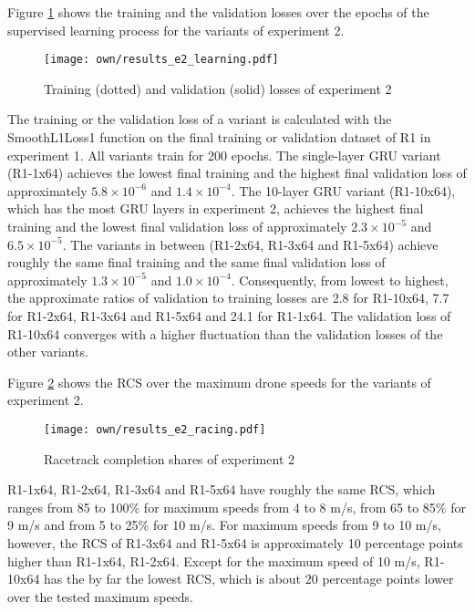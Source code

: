 Figure \ref{fig:e2_learn} shows the 
training and the validation losses
over the epochs of the supervised learning process for the variants of experiment 2.
\begin{figure}
    \centering
    \texttt{[image: own/results\_e2\_learning.pdf]}
    \caption[
        Training and validation losses of experiment 2
    ]{
        Training (dotted) and validation (solid) losses of experiment 2
    \label{fig:e2_learn}}
\end{figure}
The training or the validation loss of a variant is calculated with the SmoothL1Loss1 function 
on the final training or validation dataset of R1 in experiment 1.
All variants train for 200 epochs.
The single-layer GRU variant (R1-1x64)
achieves the lowest final training and the highest final validation loss
of approximately $5.8\times 10^{-6}$ and $1.4\times 10^{-4}$.
The 10-layer GRU variant (R1-10x64),
which has the most GRU layers in experiment 2,
achieves the highest final training and the lowest final validation loss
of approximately $2.3\times 10^{-5}$ and $6.5\times 10^{-5}$.
The variants in between (R1-2x64, R1-3x64 and R1-5x64)
achieve roughly the same final training and the same final validation loss
of approximately $1.3\times 10^{-5}$ and $1.0\times 10^{-4}$.
Consequently, from lowest to highest, the approximate
ratios of validation to training losses are 2.8 for R1-10x64, 7.7 for R1-2x64, R1-3x64 and R1-5x64
and 24.1 for R1-1x64.
The validation loss of R1-10x64
converges with a higher fluctuation than the validation losses of the other variants.


Figure \ref{fig:e2_rcs} shows the RCS over the maximum drone speeds
for the variants of experiment 2.
\begin{figure}
    \centering
    \texttt{[image: own/results\_e2\_racing.pdf]}
    \caption[
        Racetrack completion shares of experiment 2
    ]{
        Racetrack completion shares of experiment 2
    \label{fig:e2_rcs}}
\end{figure}
R1-1x64, R1-2x64, R1-3x64 and R1-5x64
have roughly the same RCS,
which ranges from 85 to 100\%
for maximum speeds from 4 to 8 m/s,
from 65 to 85\% for 9 m/s and 
from 5 to 25\% for 10 m/s.
For maximum speeds from 9 to 10 m/s, however,
the RCS of R1-3x64 and R1-5x64 is approximately 10 percentage points higher than R1-1x64, R1-2x64.
Except for the maximum speed of 10 m/s,
R1-10x64 has the by far the lowest RCS,
which is about 20 percentage points lower over the tested maximum speeds.



